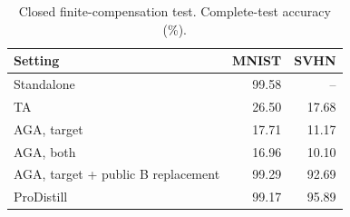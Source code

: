\begin{table}[t]
\centering\small
\caption{Closed finite-compensation test. Complete-test accuracy (\%).}
\begin{tabular}{@{}lrr@{}}
\toprule
Setting & MNIST & SVHN \\
\midrule
Standalone & 99.58 & -- \\
TA & 26.50 & 17.68 \\
AGA, target & 17.71 & 11.17 \\
AGA, both & 16.96 & 10.10 \\
AGA, target + public B replacement & 99.29 & 92.69 \\
ProDistill & 99.17 & 95.89 \\
\bottomrule
\end{tabular}
\end{table}
